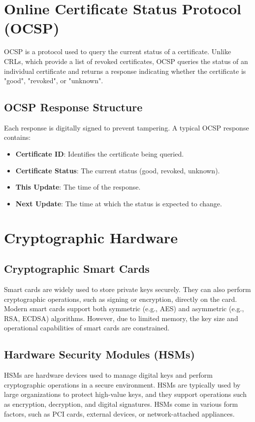 \section{Online Certificate Status Protocol (OCSP)}
OCSP is a protocol used to query the current status of a certificate. Unlike CRLs, which provide a list of revoked certificates, OCSP queries the status of an individual certificate and returns a response indicating whether the certificate is "good", "revoked", or "unknown".

\subsection{OCSP Response Structure}
Each response is digitally signed to prevent tampering. A typical OCSP response contains:
\begin{itemize}
    \item \textbf{Certificate ID}: Identifies the certificate being queried.
    \item \textbf{Certificate Status}: The current status (good, revoked, unknown).
    \item \textbf{This Update}: The time of the response.
    \item \textbf{Next Update}: The time at which the status is expected to change.
\end{itemize}

\section{Cryptographic Hardware}
\subsection{Cryptographic Smart Cards}
Smart cards are widely used to store private keys securely. They can also perform cryptographic operations, such as signing or encryption, directly on the card. Modern smart cards support both symmetric (e.g., AES) and asymmetric (e.g., RSA, ECDSA) algorithms. However, due to limited memory, the key size and operational capabilities of smart cards are constrained.

\subsection{Hardware Security Modules (HSMs)}
HSMs are hardware devices used to manage digital keys and perform cryptographic operations in a secure environment. HSMs are typically used by large organizations to protect high-value keys, and they support operations such as encryption, decryption, and digital signatures. HSMs come in various form factors, such as PCI cards, external devices, or network-attached appliances.

